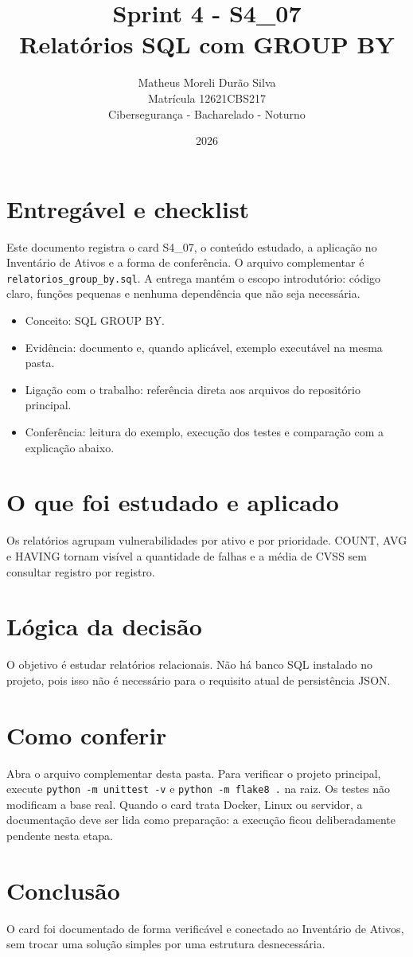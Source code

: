 \documentclass[12pt]{article}
\title{Sprint 4 - S4\_07\\Relatórios SQL com GROUP BY}
\author{Matheus Moreli Durão Silva\\ Matrícula 12621CBS217\\ Cibersegurança - Bacharelado - Noturno}
\date{2026}
\begin{document}
\maketitle

\section*{Entregável e checklist}
Este documento registra o card S4\_07, o conteúdo estudado, a aplicação no Inventário de Ativos e a forma de conferência. O arquivo complementar é \texttt{relatorios\_group\_by.sql}. A entrega mantém o escopo introdutório: código claro, funções pequenas e nenhuma dependência que não seja necessária.

\begin{itemize}
\item Conceito: SQL GROUP BY.
\item Evidência: documento e, quando aplicável, exemplo executável na mesma pasta.
\item Ligação com o trabalho: referência direta aos arquivos do repositório principal.
\item Conferência: leitura do exemplo, execução dos testes e comparação com a explicação abaixo.
\end{itemize}

\section*{O que foi estudado e aplicado}
Os relatórios agrupam vulnerabilidades por ativo e por prioridade. COUNT, AVG e HAVING tornam visível a quantidade de falhas e a média de CVSS sem consultar registro por registro.

\section*{Lógica da decisão}
O objetivo é estudar relatórios relacionais. Não há banco SQL instalado no projeto, pois isso não é necessário para o requisito atual de persistência JSON.

\section*{Como conferir}
Abra o arquivo complementar desta pasta. Para verificar o projeto principal, execute \texttt{python -m unittest -v} e \texttt{python -m flake8 .} na raiz. Os testes não modificam a base real. Quando o card trata Docker, Linux ou servidor, a documentação deve ser lida como preparação: a execução ficou deliberadamente pendente nesta etapa.

\section*{Conclusão}
O card foi documentado de forma verificável e conectado ao Inventário de Ativos, sem trocar uma solução simples por uma estrutura desnecessária.
\end{document}
